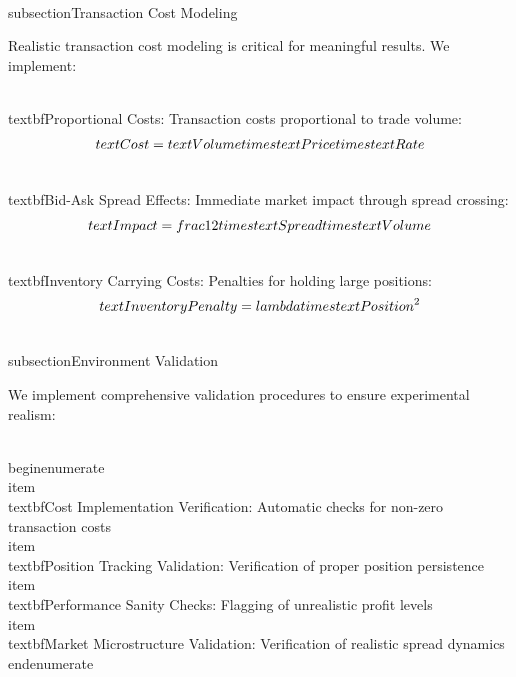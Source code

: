 \documentclass[11pt,a4paper]{article}
\begin{document}
\\subsection{Transaction Cost Modeling}

Realistic transaction cost modeling is critical for meaningful results. We implement:

\\textbf{Proportional Costs}: Transaction costs proportional to trade volume:
$$\\text{Cost} = \\text{Volume} \\times \\text{Price} \\times \\text{Rate}$$

\\textbf{Bid-Ask Spread Effects}: Immediate market impact through spread crossing:
$$\\text{Impact} = \\frac{1}{2} \\times \\text{Spread} \\times \\text{Volume}$$

\\textbf{Inventory Carrying Costs}: Penalties for holding large positions:
$$\\text{InventoryPenalty} = \\lambda \\times \\text{Position}^2$$

\\subsection{Environment Validation}

We implement comprehensive validation procedures to ensure experimental realism:

\\begin{enumerate}
\\item \\textbf{Cost Implementation Verification}: Automatic checks for non-zero transaction costs
\\item \\textbf{Position Tracking Validation}: Verification of proper position persistence
\\item \\textbf{Performance Sanity Checks}: Flagging of unrealistic profit levels
\\item \\textbf{Market Microstructure Validation}: Verification of realistic spread dynamics
\\end{enumerate}
\end{document}
